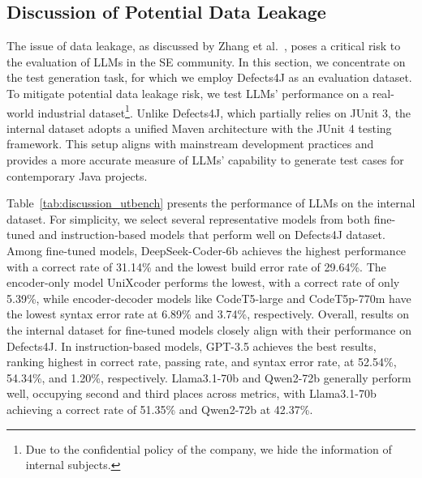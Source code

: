 \subsection{Discussion of Potential Data Leakage}
\label{sec:discussion_utbench}

The issue of data leakage, as discussed by Zhang et al.~\cite{zhang2023critical}, poses a critical risk to the evaluation of LLMs in the SE community.
In this section, we concentrate on the test generation task, for which we employ Defects4J as an evaluation dataset. 
To mitigate potential data leakage risk, we test LLMs' performance on a real-world industrial dataset\footnote{Due to the confidential policy of the company, we hide the information of internal subjects.}.
Unlike Defects4J, which partially relies on JUnit 3, the internal dataset adopts a unified Maven architecture with the JUnit 4 testing framework. This setup aligns with mainstream development practices and provides a more accurate measure of LLMs' capability to generate test cases for contemporary Java projects.





Table~\ref{tab:discussion_utbench} presents the performance of LLMs on the internal dataset. For simplicity, we select several representative models from both fine-tuned and instruction-based models that perform well on Defects4J dataset. 
Among fine-tuned models, DeepSeek-Coder-6b achieves the highest performance with a correct rate of 31.14\% and the lowest build error rate of 29.64\%. The encoder-only model UniXcoder performs the lowest, with a correct rate of only 5.39\%, while encoder-decoder models like CodeT5-large and CodeT5p-770m have the lowest syntax error rate at 6.89\% and 3.74\%, respectively. Overall, results on the internal dataset for fine-tuned models closely align with their performance on Defects4J.
In instruction-based models, GPT-3.5 achieves the best results, ranking highest in correct rate, passing rate, and syntax error rate, at 52.54\%, 54.34\%, and 1.20\%, respectively. Llama3.1-70b and Qwen2-72b generally perform well, occupying second and third places across metrics, with Llama3.1-70b achieving a correct rate of 51.35\% and Qwen2-72b at 42.37\%.  

